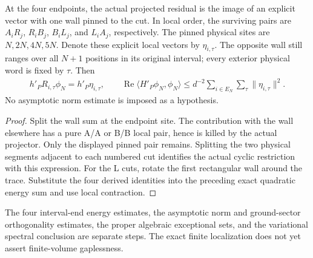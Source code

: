 \begin{lemma}
    \label{lem:uncle_trial_pinned_endpoint_residuals}
    \leanok
    At the four endpoints, the actual projected residual is the image of
    an explicit vector with one wall pinned to the cut. In local order,
    the surviving pairs are $A_iR_j$, $R_iB_j$, $B_iL_j$, and $L_iA_j$,
    respectively. The pinned physical sites are $N,2N,4N,5N$.
    Denote these explicit local vectors by $\eta_{i,\tau}$. The opposite
    wall still ranges over all $N+1$ positions in its original interval;
    every exterior physical word is fixed by $\tau$. Then
    \begin{align}
        h'_P R_{i,\tau}\phi_N=h'_P\eta_{i,\tau},\qquad
        \operatorname{Re}\langle H'_P\phi_N,\phi_N\rangle
        \le d^{-2}\sum_{i\in E_N}\sum_\tau\|\eta_{i,\tau}\|^2.
    \end{align}
    No asymptotic norm estimate is imposed as a hypothesis.
\end{lemma}
\begin{proof}\leanok
    Split the wall sum at the endpoint site. The contribution with the
    wall elsewhere has a pure A/A or B/B local pair, hence is killed by
    the actual projector. Only the displayed pinned pair remains.
    Splitting the two physical segments adjacent to each numbered cut
    identifies the actual cyclic restriction with this expression.
    For the L cuts, rotate the first rectangular wall around the trace.
    Substitute the four derived identities into the preceding exact
    quadratic energy sum and use local contraction.
\end{proof}

The four interval-end energy estimates, the asymptotic norm and ground-sector
orthogonality estimates, the proper algebraic exceptional sets, and the
variational spectral conclusion are separate steps. The exact finite
localization does not yet assert finite-volume gaplessness.
